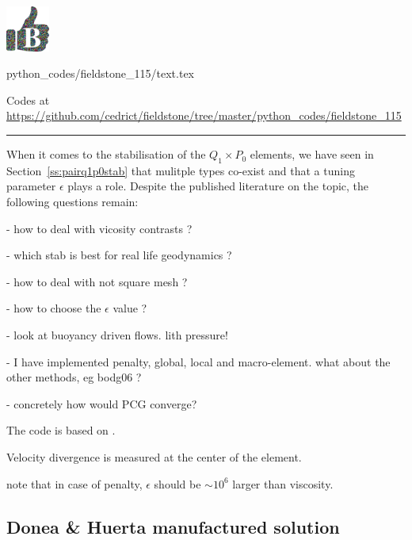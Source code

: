 \includegraphics[height=1.5cm]{images/pictograms/benchmark}

\begin{flushright} {\tiny {\color{gray} python\_codes/fieldstone\_115/text.tex}} \end{flushright}



\begin{center}
Codes at \url{https://github.com/cedrict/fieldstone/tree/master/python_codes/fieldstone_115}
\end{center}

\par\noindent\rule{\textwidth}{0.4pt}




When it comes to the stabilisation of the $Q_1\times P_0$ elements, 
we have seen in Section~\ref{ss:pairq1p0stab} that mulitple types co-exist
and that a tuning parameter $\epsilon$ plays a role. 
Despite the published literature on the topic, the following questions remain:

- how to deal with vicosity contrasts ? 

- which stab is best for real life geodynamics ? 

- how to deal with not square mesh ?

- how to choose the $\epsilon$ value ?

- look at buoyancy driven flows. lith pressure!

- I have implemented penalty, global, local and macro-element. what about the other methods, eg bodg06 ?

- concretely how would PCG converge?

The code is based on .

Velocity divergence is measured at the center of the element.

note that in case of penalty, $\epsilon$ should be $\sim 10^6$ larger than viscosity.

\subsection*{Donea \& Huerta manufactured solution}


